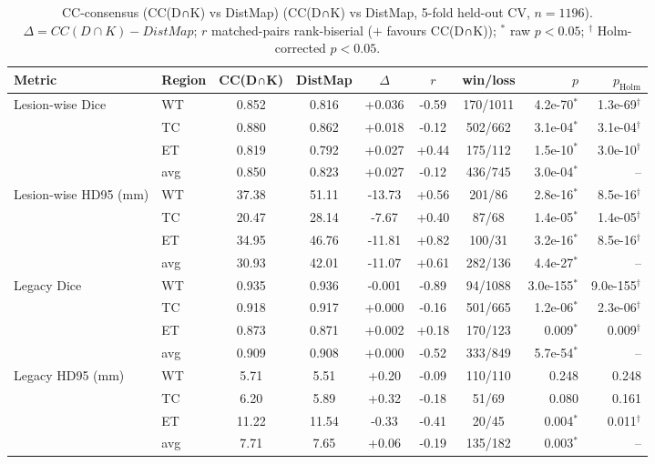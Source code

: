 \begin{table}[t]
\centering
\caption{CC-consensus (CC(D∩K) vs DistMap) (CC(D∩K) vs DistMap, 5-fold held-out CV, $n=1196$). $\Delta=CC(D∩K)-DistMap$; $r$ matched-pairs rank-biserial ($+$ favours CC(D∩K)); $^{*}$ raw $p<0.05$; $^{\dagger}$ Holm-corrected $p<0.05$.}
\label{tab:cc_distmap}
\begin{tabular}{llcccccrr}
\toprule
Metric & Region & CC(D∩K) & DistMap & $\Delta$ & $r$ & win/loss & $p$ & $p_{\mathrm{Holm}}$ \\
\midrule
\multirow{4}{*}{Lesion-wise Dice} & WT & 0.852 & 0.816 & +0.036 & -0.59 & 170/1011 & 4.2e-70$^{*}$ & 1.3e-69$^{\dagger}$ \\
 & TC & 0.880 & 0.862 & +0.018 & -0.12 & 502/662 & 3.1e-04$^{*}$ & 3.1e-04$^{\dagger}$ \\
 & ET & 0.819 & 0.792 & +0.027 & +0.44 & 175/112 & 1.5e-10$^{*}$ & 3.0e-10$^{\dagger}$ \\
 & avg & 0.850 & 0.823 & +0.027 & -0.12 & 436/745 & 3.0e-04$^{*}$ & -- \\
\midrule
\multirow{4}{*}{Lesion-wise HD95 (mm)} & WT & 37.38 & 51.11 & -13.73 & +0.56 & 201/86 & 2.8e-16$^{*}$ & 8.5e-16$^{\dagger}$ \\
 & TC & 20.47 & 28.14 & -7.67 & +0.40 & 87/68 & 1.4e-05$^{*}$ & 1.4e-05$^{\dagger}$ \\
 & ET & 34.95 & 46.76 & -11.81 & +0.82 & 100/31 & 3.2e-16$^{*}$ & 8.5e-16$^{\dagger}$ \\
 & avg & 30.93 & 42.01 & -11.07 & +0.61 & 282/136 & 4.4e-27$^{*}$ & -- \\
\midrule
\multirow{4}{*}{Legacy Dice} & WT & 0.935 & 0.936 & -0.001 & -0.89 & 94/1088 & 3.0e-155$^{*}$ & 9.0e-155$^{\dagger}$ \\
 & TC & 0.918 & 0.917 & +0.000 & -0.16 & 501/665 & 1.2e-06$^{*}$ & 2.3e-06$^{\dagger}$ \\
 & ET & 0.873 & 0.871 & +0.002 & +0.18 & 170/123 & 0.009$^{*}$ & 0.009$^{\dagger}$ \\
 & avg & 0.909 & 0.908 & +0.000 & -0.52 & 333/849 & 5.7e-54$^{*}$ & -- \\
\midrule
\multirow{4}{*}{Legacy HD95 (mm)} & WT & 5.71 & 5.51 & +0.20 & -0.09 & 110/110 & 0.248 & 0.248 \\
 & TC & 6.20 & 5.89 & +0.32 & -0.18 & 51/69 & 0.080 & 0.161 \\
 & ET & 11.22 & 11.54 & -0.33 & -0.41 & 20/45 & 0.004$^{*}$ & 0.011$^{\dagger}$ \\
 & avg & 7.71 & 7.65 & +0.06 & -0.19 & 135/182 & 0.003$^{*}$ & -- \\
\midrule
\bottomrule
\end{tabular}
\end{table}

